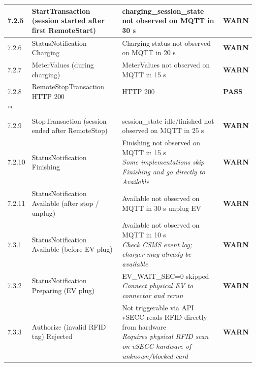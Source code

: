\documentclass[10pt, a4paper]{article}
\begin{document}
\begin{longtable}{|L{1cm}|L{5.5cm}|M{7cm}|C{1.8cm}|}
\hline
\small 7.2.5 & \small StartTransaction (session started after first RemoteStart) & charging\_session\_state not observed on MQTT in 30 s & \textcolor{warnorange}{\textbf{WARN}} \\
\hline
\small 7.2.6 & \small StatusNotification Charging & Charging status not observed on MQTT in 20 s & \textcolor{warnorange}{\textbf{WARN}} \\
\hline
\small 7.2.7 & \small MeterValues (during charging) & MeterValues not observed on MQTT in 15 s & \textcolor{warnorange}{\textbf{WARN}} \\
\hline
\small 7.2.8 & \small RemoteStopTransaction  HTTP 200 & HTTP 200 & \textcolor{passgreen}{\textbf{PASS}} \\
\hline
{} \\
\hline
\small 7.2.9 & \small StopTransaction (session ended after RemoteStop) & session\_state idle/finished not observed on MQTT in 25 s & \textcolor{warnorange}{\textbf{WARN}} \\
\hline
\small 7.2.10 & \small StatusNotification Finishing & Finishing not observed on MQTT in 15 s{\newline\normalfont\footnotesize\itshape Some implementations skip Finishing and go directly to Available} & \textcolor{warnorange}{\textbf{WARN}} \\
\hline
\small 7.2.11 & \small StatusNotification Available (after stop / unplug) & Available not observed on MQTT in 30 s  unplug EV & \textcolor{warnorange}{\textbf{WARN}} \\
\hline
\small 7.3.1 & \small StatusNotification Available (before EV plug) & Available not observed on MQTT in 10 s{\newline\normalfont\footnotesize\itshape Check CSMS event log; charger may already be available} & \textcolor{warnorange}{\textbf{WARN}} \\
\hline
\small 7.3.2 & \small StatusNotification Preparing (EV plug) & EV\_WAIT\_SEC=0  skipped{\newline\normalfont\footnotesize\itshape Connect physical EV to connector and rerun} & \textcolor{warnorange}{\textbf{WARN}} \\
\hline
\small 7.3.3 & \small Authorize (invalid RFID tag)  Rejected & Not triggerable via API  vSECC reads RFID directly from hardware{\newline\normalfont\footnotesize\itshape Requires physical RFID scan on vSECC hardware of unknown/blocked card} & \textcolor{warnorange}{\textbf{WARN}} \\

\end{longtable}
\end{document}
